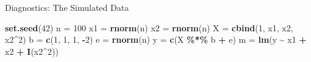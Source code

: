 \documentclass[
  ignorenonframetext,
]{beamer}
\newenvironment{Shaded}{\begin{snugshade}}{\end{snugshade}}
\newcommand{\DecValTok}[1]{\textcolor[rgb]{0.00,0.00,0.81}{#1}}
\newcommand{\FunctionTok}[1]{\textcolor[rgb]{0.13,0.29,0.53}{\textbf{#1}}}
\newcommand{\NormalTok}[1]{#1}
\newcommand{\OtherTok}[1]{\textcolor[rgb]{0.56,0.35,0.01}{#1}}
\newcommand{\SpecialCharTok}[1]{\textcolor[rgb]{0.81,0.36,0.00}{\textbf{#1}}}
\begin{document}
\begin{frame}[fragile]{Diagnostics: The Simulated Data}
\label{diagnostics-the-simulated-data}
\begin{Shaded}
\begin{Highlighting}[]
\FunctionTok{set.seed}\NormalTok{(}\DecValTok{42}\NormalTok{)}
\NormalTok{n  }\OtherTok{=} \DecValTok{100}
\NormalTok{x1 }\OtherTok{=} \FunctionTok{rnorm}\NormalTok{(n)}
\NormalTok{x2 }\OtherTok{=} \FunctionTok{rnorm}\NormalTok{(n)}
\NormalTok{X  }\OtherTok{=} \FunctionTok{cbind}\NormalTok{(}\DecValTok{1}\NormalTok{, x1, x2, x2}\SpecialCharTok{\^{}}\DecValTok{2}\NormalTok{)}
\NormalTok{b  }\OtherTok{=} \FunctionTok{c}\NormalTok{(}\DecValTok{1}\NormalTok{, }\DecValTok{1}\NormalTok{, }\DecValTok{1}\NormalTok{, }\SpecialCharTok{{-}}\DecValTok{2}\NormalTok{)}
\NormalTok{e  }\OtherTok{=} \FunctionTok{rnorm}\NormalTok{(n)}
\NormalTok{y  }\OtherTok{=} \FunctionTok{c}\NormalTok{(X }\SpecialCharTok{\%*\%}\NormalTok{ b }\SpecialCharTok{+}\NormalTok{ e)}
\NormalTok{m  }\OtherTok{=} \FunctionTok{lm}\NormalTok{(y }\SpecialCharTok{\textasciitilde{}}\NormalTok{ x1 }\SpecialCharTok{+}\NormalTok{ x2 }\SpecialCharTok{+} \FunctionTok{I}\NormalTok{(x2}\SpecialCharTok{\^{}}\DecValTok{2}\NormalTok{))}
\end{Highlighting}
\end{Shaded}
\end{frame}
\end{document}
